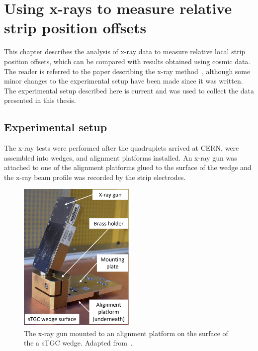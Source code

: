 
\chapter{Using x-rays to measure relative strip position offsets}
\label{chap:xray}

This chapter describes the analysis of x-ray data to measure relative local strip position offsets, which can be compared with results obtained using cosmic data. The reader is referred to the paper describing the x-ray method~\cite{lefebvre_precision_2020}, although some minor changes to the experimental setup  have been made since it was written. The experimental setup described here is current and was used to collect the data presented in this thesis.

\section{Experimental setup}

The x-ray tests were performed after the quadruplets arrived at CERN, were assembled into wedges, and alignment platforms installed. An x-ray gun was attached to one of the alignment platforms glued to the surface of the wedge and the x-ray beam profile was recorded by the strip electrodes.

\begin{figure}[t]
    \centering
    \includegraphics[width = 0.5\textwidth]{figures/xray_setup.png}
    \caption{The x-ray gun mounted to an alignment platform on the surface of the a sTGC wedge. Adapted from~\cite{lefebvre_precision_2020}.}
    \label{fig:xray_setup}
\end{figure}

